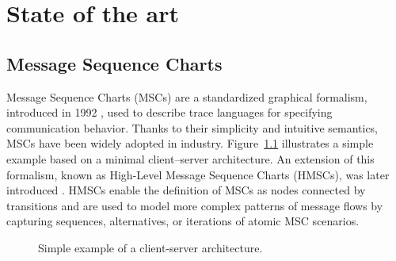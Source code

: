 \chapter{State of the art}\label{sec:sota}



\section{Message Sequence Charts}
Message Sequence Charts (MSCs) are a standardized graphical formalism,
introduced in 1992 \cite{MSCStandard}, used to describe trace languages for specifying
communication behavior. Thanks to their simplicity and intuitive
semantics, MSCs have been widely adopted in industry.
Figure~\ref{fig:msc-cli-ser} illustrates a simple example based on a
minimal client–server architecture. An extension of this formalism,
known as High-Level Message Sequence Charts (HMSCs), was later
introduced \cite{HMSCStandard}. HMSCs enable the definition of
MSCs as nodes connected by transitions and are used to model more
complex patterns of message flows by capturing sequences, alternatives,
or iterations of atomic MSC scenarios.

\begin{figure}[!ht]
\centering
\begin{msc}[draw frame=none, draw head=none, msc keyword=, head height=0px, label distance=0.5ex, foot height=0px, foot distance=0px]{}

	\nextlevel
\end{msc}
\caption{Simple example of a client-server architecture.}
\label{fig:msc-cli-ser}
\end{figure}


